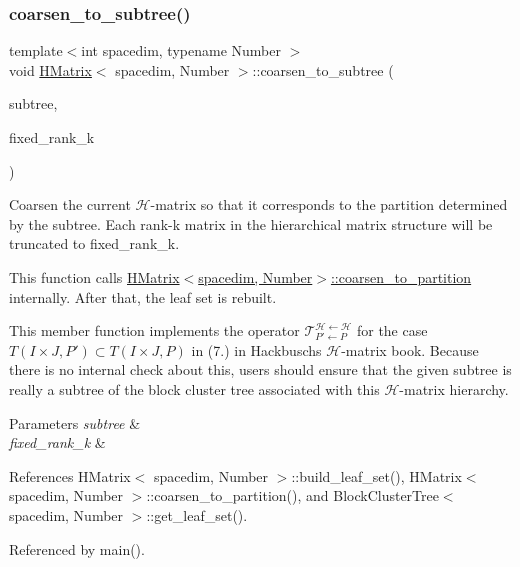 \subsubsection{\texorpdfstring{coarsen\+\_\+to\+\_\+subtree()}{coarsen\_to\_subtree()}}
{\footnotesize\ttfamily template$<$int spacedim, typename Number $>$ \\
void \hyperlink{classHMatrix}{H\+Matrix}$<$ spacedim, Number $>$\+::coarsen\+\_\+to\+\_\+subtree (\begin{DoxyParamCaption}\item[{const \hyperlink{classBlockClusterTree}{Block\+Cluster\+Tree}$<$ spacedim, Number $>$ \&}]{subtree,  }\item[{const unsigned int}]{fixed\+\_\+rank\+\_\+k }\end{DoxyParamCaption})}

Coarsen the current $\mathcal{H}$-\/matrix so that it corresponds to the partition determined by the {\ttfamily subtree}. Each rank-\/k matrix in the hierarchical matrix structure will be truncated to {\ttfamily fixed\+\_\+rank\+\_\+k}.

This function calls {\ttfamily \hyperlink{classHMatrix_a525ad4d453f4f496b98cccb341c8b60b}{H\+Matrix$<$spacedim, Number$>$\+::coarsen\+\_\+to\+\_\+partition}} internally. After that, the leaf set is rebuilt.

This member function implements the operator $\mathcal{T}_{P' \leftarrow P}^{\mathcal{H} \leftarrow \mathcal{H}}$ for the case $T(I \times J, P') \subset T(I \times J, P)$ in (7.) in Hackbusch\textquotesingle{}s $\mathcal{H}$-\/matrix book. Because there is no internal check about this, users should ensure that the given {\ttfamily subtree} is really a subtree of the block cluster tree associated with this $\mathcal{H}$-\/matrix hierarchy.


\begin{DoxyParams}{Parameters}
{\em subtree} & \\
\hline
{\em fixed\+\_\+rank\+\_\+k} & \\
\hline
\end{DoxyParams}


References H\+Matrix$<$ spacedim, Number $>$\+::build\+\_\+leaf\+\_\+set(), H\+Matrix$<$ spacedim, Number $>$\+::coarsen\+\_\+to\+\_\+partition(), and Block\+Cluster\+Tree$<$ spacedim, Number $>$\+::get\+\_\+leaf\+\_\+set().



Referenced by main().

\mbox{\label{classHMatrix_a7d6c76f7db2b9239f24df292e945a970}} 
